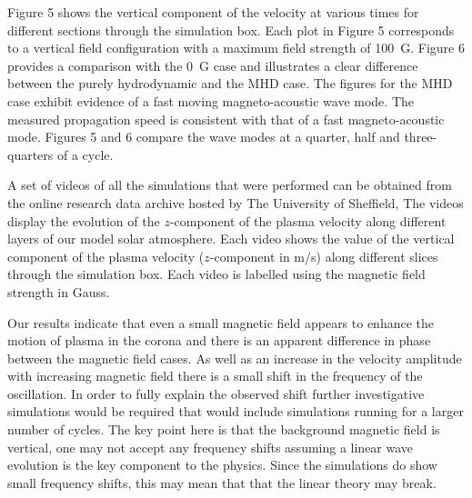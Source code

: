 \documentclass[physics,article,submit,pdftex,moreauthors]{Definitions/mdpi}
\begin{document}


 Figure 5 %
 shows the vertical component of the velocity at various times for different sections through the simulation box. Each plot in  Figure 5 %
 corresponds to a vertical field configuration with a maximum field strength of 100~G. Figure 6 provides a comparison with the 0~G case and %
 illustrates a clear difference between the purely hydrodynamic and the MHD case. The figures for the MHD case exhibit evidence of a fast moving magneto-acoustic wave mode. The measured propagation speed is consistent with that of a fast magneto-acoustic mode. Figures 5 and 6 compare the wave modes at a quarter, half and three-quarters of a cycle. 

 A set of videos of all the simulations that were performed can be obtained from the online research data archive hosted by The University of Sheffield, \citet{Griffiths2018a} 
 The videos display the evolution of the $z$-component of the plasma velocity along different layers of our model solar atmosphere. Each video shows the value of the vertical component of the plasma velocity ($z$-component in m/s) along different slices through the simulation box. Each video is labelled using the magnetic field strength in Gauss. 
  
  Our results indicate that even a small magnetic field appears to enhance the motion of plasma in the corona and  there is an apparent difference in phase between the magnetic field cases. As well as an increase in the velocity amplitude with increasing magnetic field there is a small shift in the frequency of the oscillation. In order to fully explain the observed shift further investigative simulations would be required  that would include simulations running for a larger number of cycles.  The key point here is that the background magnetic field is vertical, one may not accept any frequency shifts assuming a linear wave evolution is the key component to the physics. Since the simulations do show small frequency shifts, this may mean that that the linear theory may break.
  
\end{document}
